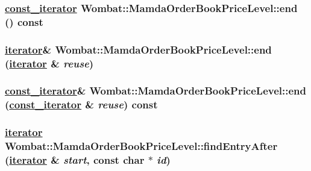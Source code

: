 \hypertarget{classWombat_1_1MamdaOrderBookPriceLevel_b3a9b7653c7bfa13a15d9418f0504605}{
\subsubsection[end]{\setlength{\rightskip}{0pt plus 5cm}\hyperlink{classWombat_1_1MamdaOrderBookPriceLevel_1_1iterator}{const\_\-iterator} Wombat::Mamda\-Order\-Book\-Price\-Level::end () const}}
\label{classWombat_1_1MamdaOrderBookPriceLevel_b3a9b7653c7bfa13a15d9418f0504605}


\hypertarget{classWombat_1_1MamdaOrderBookPriceLevel_fad24ca9bf0418857ab41dbf4b62b2cc}{
\subsubsection[end]{\setlength{\rightskip}{0pt plus 5cm}\hyperlink{classWombat_1_1MamdaOrderBookPriceLevel_1_1iterator}{iterator}\& Wombat::Mamda\-Order\-Book\-Price\-Level::end (\hyperlink{classWombat_1_1MamdaOrderBookPriceLevel_1_1iterator}{iterator} \& {\em reuse})}}
\label{classWombat_1_1MamdaOrderBookPriceLevel_fad24ca9bf0418857ab41dbf4b62b2cc}


\hypertarget{classWombat_1_1MamdaOrderBookPriceLevel_676459401e5e1527188cfbd9a1a6960f}{
\subsubsection[end]{\setlength{\rightskip}{0pt plus 5cm}\hyperlink{classWombat_1_1MamdaOrderBookPriceLevel_1_1iterator}{const\_\-iterator}\& Wombat::Mamda\-Order\-Book\-Price\-Level::end (\hyperlink{classWombat_1_1MamdaOrderBookPriceLevel_1_1iterator}{const\_\-iterator} \& {\em reuse}) const}}
\label{classWombat_1_1MamdaOrderBookPriceLevel_676459401e5e1527188cfbd9a1a6960f}


\hypertarget{classWombat_1_1MamdaOrderBookPriceLevel_b873e17094774419280b582b19c81b6d}{
\subsubsection[findEntryAfter]{\setlength{\rightskip}{0pt plus 5cm}\hyperlink{classWombat_1_1MamdaOrderBookPriceLevel_1_1iterator}{iterator} Wombat::Mamda\-Order\-Book\-Price\-Level::find\-Entry\-After (\hyperlink{classWombat_1_1MamdaOrderBookPriceLevel_1_1iterator}{iterator} \& {\em start}, const char $\ast$ {\em id})}}
\label{classWombat_1_1MamdaOrderBookPriceLevel_b873e17094774419280b582b19c81b6d}


